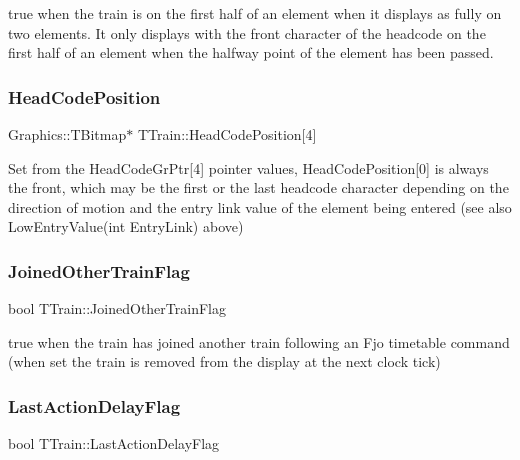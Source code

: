 true when the train is on the first half of an element when it displays as fully on two elements. It only displays with the front character of the headcode on the first half of an element when the halfway point of the element has been passed. \mbox{\label{class_t_train_a9b4cfd30341ab156b539eb3a5a9fe7a3}} 
\subsubsection{\texorpdfstring{Head\+Code\+Position}{HeadCodePosition}}
{\footnotesize\ttfamily Graphics\+::\+T\+Bitmap$\ast$ T\+Train\+::\+Head\+Code\+Position\mbox{[}4\mbox{]}\hspace{0.3cm}{\ttfamily [private]}}

Set from the Head\+Code\+Gr\+Ptr\mbox{[}4\mbox{]} pointer values, Head\+Code\+Position\mbox{[}0\mbox{]} is always the front, which may be the first or the last headcode character depending on the direction of motion and the entry link value of the element being entered (see also Low\+Entry\+Value(int Entry\+Link) above) \mbox{\label{class_t_train_a843a31af1c4faec4d71a61d32d6f4510}} 
\subsubsection{\texorpdfstring{Joined\+Other\+Train\+Flag}{JoinedOtherTrainFlag}}
{\footnotesize\ttfamily bool T\+Train\+::\+Joined\+Other\+Train\+Flag\hspace{0.3cm}{\ttfamily [private]}}

true when the train has joined another train following an \textquotesingle{}Fjo\textquotesingle{} timetable command (when set the train is removed from the display at the next clock tick) \mbox{\label{class_t_train_a1b53d5506e8a5bdfd55286ae2dc2d3f2}} 
\subsubsection{\texorpdfstring{Last\+Action\+Delay\+Flag}{LastActionDelayFlag}}
{\footnotesize\ttfamily bool T\+Train\+::\+Last\+Action\+Delay\+Flag\hspace{0.3cm}{\ttfamily [private]}}

